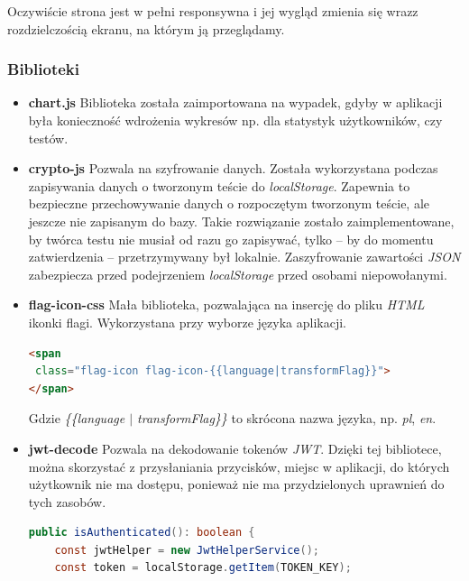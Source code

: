 \documentclass[twoside]{projektInzynierskiMS}
\numberwithin{figure}{section}
\begin{document}
\newpage

Oczywiście strona jest w pełni responsywna i jej wygląd zmienia się wraz\linebreak z rozdzielczością ekranu, na którym ją przeglądamy.
\subsubsection{Biblioteki}
\begin{itemize}
    \item \textbf{chart.js}\newline
    Biblioteka została zaimportowana na wypadek, gdyby w aplikacji była konieczność wdrożenia wykresów np. dla statystyk użytkowników, czy testów.
    \item \textbf{crypto-js}\newline
    Pozwala na szyfrowanie danych. Została wykorzystana podczas zapisywania danych o tworzonym teście do \textit{localStorage}. Zapewnia to bezpieczne przechowywanie danych o rozpoczętym tworzonym teście, ale jeszcze nie zapisanym do bazy. Takie rozwiązanie zostało zaimplementowane, by twórca testu nie musiał od razu go zapisywać, tylko -- by do momentu zatwierdzenia -- przetrzymywany był lokalnie. Zaszyfrowanie zawartości \textit{JSON} zabezpiecza przed podejrzeniem \textit{localStorage} przed osobami niepowołanymi.

\item \textbf{flag-icon-css}\newline
Mała biblioteka, pozwalająca na insercję do pliku \textit{HTML} ikonki flagi. Wykorzystana przy wyborze języka aplikacji.

\begin{lstlisting}[language=html,caption=Implementacja ikonki flagi. Źródło: Opracowanie własne.,captionpos=b]
<span 
 class="flag-icon flag-icon-{{language|transformFlag}}">
</span>
\end{lstlisting}
Gdzie \textit{\{\{language $|$ transformFlag\}\}} to skrócona nazwa języka, np. \textit{pl}, \textit{en}.

\item \textbf{jwt-decode}\newline
Pozwala na dekodowanie tokenów \textit{JWT}. Dzięki tej bibliotece, można skorzystać z przysłaniania przycisków, miejsc w aplikacji, do których użytkownik nie ma dostępu, ponieważ nie ma przydzielonych uprawnień do tych zasobów.\newline
\newpage
\begin{lstlisting}[language=Java,caption=Implementacja sprawdzenia poprawności tokenu oraz jego ważności. Źródło: Opracowanie własne.,captionpos=b]
  public isAuthenticated(): boolean {
    const jwtHelper = new JwtHelperService();
    const token = localStorage.getItem(TOKEN_KEY);


\end{lstlisting}
\end{itemize}
\end{document}
